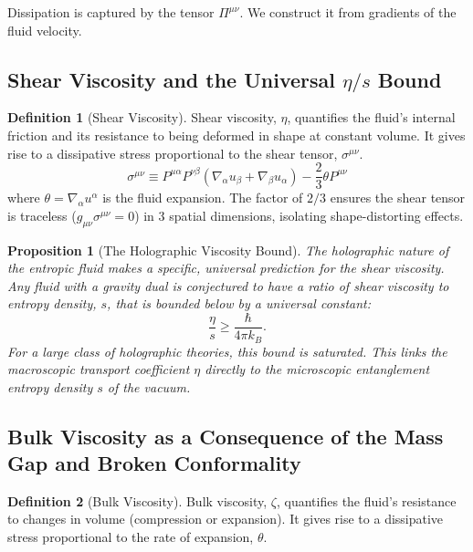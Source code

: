 \documentclass[11pt, letterpaper]{report}
\theoremstyle{plain} %
\newtheorem{proposition}[theorem]{Proposition}
\theoremstyle{definition} %
\newtheorem{definition}{Definition}[chapter]
\theoremstyle{remark} %
\begin{document}
Dissipation is captured by the tensor $\Pi^{\mu\nu}$. We construct it from gradients of the fluid velocity.

\subsection{Shear Viscosity and the Universal \texorpdfstring{$\eta/s$}{eta/s} Bound}
\label{subsec:shear_viscosity}

\begin{definition}[Shear Viscosity]
Shear viscosity, $\eta$, quantifies the fluid's internal friction and its resistance to being deformed in shape at constant volume. It gives rise to a dissipative stress proportional to the shear tensor, $\sigma^{\mu\nu}$.
\begin{equation}
    \sigma^{\mu\nu} \equiv P^{\mu\alpha}P^{\nu\beta}\left(\nabla_\alpha u_\beta + \nabla_\beta u_\alpha\right) - \frac{2}{3}\theta P^{\mu\nu}
\end{equation}
where $\theta = \nabla_\alpha u^\alpha$ is the fluid expansion. The factor of $2/3$ ensures the shear tensor is traceless ($g_{\mu\nu}\sigma^{\mu\nu}=0$) in 3 spatial dimensions, isolating shape-distorting effects.
\end{definition}

\begin{proposition}[The Holographic Viscosity Bound]
The holographic nature of the entropic fluid makes a specific, universal prediction for the shear viscosity. Any fluid with a gravity dual is conjectured to have a ratio of shear viscosity to entropy density, $s$, that is bounded below by a universal constant:
\begin{equation}
    \frac{\eta}{s} \ge \frac{\hbar}{4\pi k_B}.
\end{equation}
For a large class of holographic theories, this bound is saturated. This links the macroscopic transport coefficient $\eta$ directly to the microscopic entanglement entropy density $s$ of the vacuum.
\end{proposition}

\subsection{Bulk Viscosity as a Consequence of the Mass Gap and Broken Conformality}
\label{subsec:bulk_viscosity}

\begin{definition}[Bulk Viscosity]
Bulk viscosity, $\zeta$, quantifies the fluid's resistance to changes in volume (compression or expansion). It gives rise to a dissipative stress proportional to the rate of expansion, $\theta$.
\end{definition}
\end{document}

